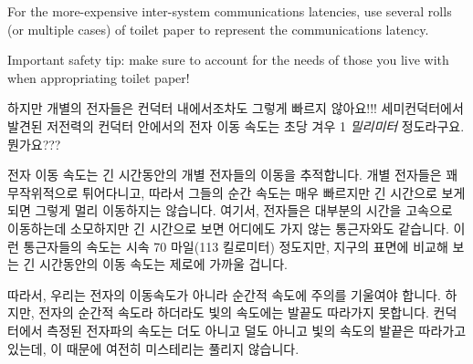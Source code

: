 \begin{enumerate}
	For the more-expensive inter-system communications latencies,
	use several rolls (or multiple cases) of toilet paper to represent
	the communications latency.

	Important safety tip: make sure to account for the needs of
	those you live with when appropriating toilet paper!
	\fi

\QuickQ{}
	하지만 개별의 전자들은 컨덕터 내에서조차도 그렇게 빠르지 않아요!!!
	세미컨덕터에서 발견된 저전력의 컨덕터 안에서의 전자 이동 속도는 초당
	겨우 1 \emph{밀리미터} 정도라구요.
	뭔가요???

\QuickA{}
	전자 이동 속도는 긴 시간동안의 개별 전자들의 이동을 추적합니다.
	개별 전자들은 꽤 무작위적으로 튀어다니고, 따라서 그들의 순간 속도는
	매우 빠르지만 긴 시간으로 보게 되면 그렇게 멀리 이동하지는 않습니다.
	여기서, 전자들은 대부분의 시간을 고속으로 이동하는데 소모하지만 긴
	시간으로 보면 어디에도 가지 않는 통근자와도 같습니다.
	이런 통근자들의 속도는 시속 70 마일(113 킬로미터) 정도지만, 지구의
	표면에 비교해 보는 긴 시간동안의 이동 속도는 제로에 가까울 겁니다.

	따라서, 우리는 전자의 이동속도가 아니라 순간적 속도에 주의를 기울여야
	합니다.
	하지만, 전자의 순간적 속도라 하더라도 빛의 속도에는 발끝도 따라가지
	못합니다.
	컨덕터에서 측정된 전자파의 속도는 더도 아니고 덜도 아니고 빛의 속도의
	발끝은 따라가고 있는데, 이 때문에 여전히 미스테리는 풀리지 않습니다.

\end{enumerate}
